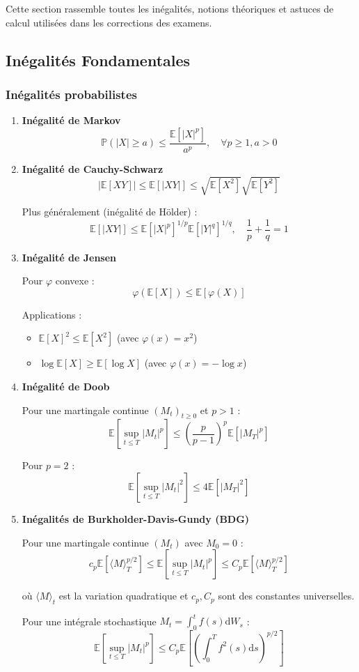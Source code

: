 \documentclass[12pt,a4paper]{article}
\theoremstyle{definition}
\theoremstyle{remark}
\newcommand{\E}{\mathbb{E}}
\newcommand{\Prob}{\mathbb{P}}
\newcommand{\dd}{\mathrm{d}}
\begin{document}
Cette section rassemble toutes les inégalités, notions théoriques et astuces de calcul utilisées dans les corrections des examens.

\subsection{Inégalités Fondamentales}

\subsubsection{Inégalités probabilistes}

\begin{enumerate}
\item \textbf{Inégalité de Markov}
\[
\Prob(|X| \geq a) \leq \frac{\E[|X|^p]}{a^p}, \quad \forall p \geq 1, a > 0
\]

\item \textbf{Inégalité de Cauchy-Schwarz}
\[
|\E[XY]| \leq \E[|XY|] \leq \sqrt{\E[X^2]}\sqrt{\E[Y^2]}
\]

Plus généralement (inégalité de Hölder) :
\[
\E[|XY|] \leq \E[|X|^p]^{1/p}\E[|Y|^q]^{1/q}, \quad \frac{1}{p} + \frac{1}{q} = 1
\]

\item \textbf{Inégalité de Jensen}

Pour $\varphi$ convexe :
\[
\varphi(\E[X]) \leq \E[\varphi(X)]
\]

Applications :
\begin{itemize}
\item $\E[X]^2 \leq \E[X^2]$ (avec $\varphi(x) = x^2$)
\item $\log \E[X] \geq \E[\log X]$ (avec $\varphi(x) = -\log x$)
\end{itemize}

\item \textbf{Inégalité de Doob}

Pour une martingale continue $(M_t)_{t \geq 0}$ et $p > 1$ :
\[
\E\left[\sup_{t \leq T} |M_t|^p\right] \leq \left(\frac{p}{p-1}\right)^p \E[|M_T|^p]
\]

Pour $p = 2$ :
\[
\E\left[\sup_{t \leq T} |M_t|^2\right] \leq 4\E[|M_T|^2]
\]

\item \textbf{Inégalités de Burkholder-Davis-Gundy (BDG)}

Pour une martingale continue $(M_t)$ avec $M_0 = 0$ :
\[
c_p \E[\langle M \rangle_T^{p/2}] \leq \E\left[\sup_{t \leq T} |M_t|^p\right] \leq C_p \E[\langle M \rangle_T^{p/2}]
\]

où $\langle M \rangle_t$ est la variation quadratique et $c_p, C_p$ sont des constantes universelles.

Pour une intégrale stochastique $M_t = \int_0^t f(s)\dd W_s$ :
\[
\E\left[\sup_{t \leq T} |M_t|^p\right] \leq C_p \E\left[\left(\int_0^T f^2(s)\dd s\right)^{p/2}\right]
\]
\end{enumerate}
\end{document}
